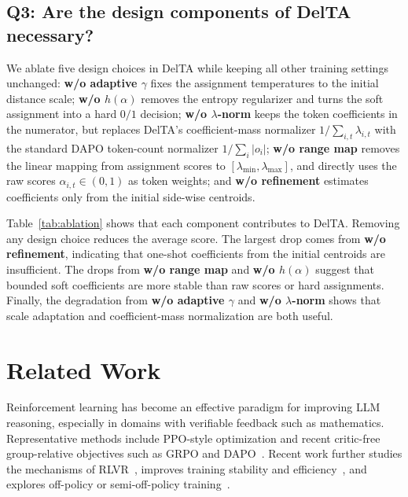 \documentclass{article} %
\begin{document}
\subsection{Q3: Are the design components of DelTA necessary?}
\label{sec:ablation}

We ablate five design choices in DelTA while keeping all other training settings unchanged:
\textbf{w/o adaptive \(\gamma\)} fixes the assignment temperatures to the initial distance scale;
\textbf{w/o \(h(\alpha)\)} removes the entropy regularizer and turns the soft assignment into a hard \(0/1\) decision;
\textbf{w/o \(\lambda\)-norm} keeps the token coefficients in the numerator, but replaces DelTA's coefficient-mass normalizer \(1/\sum_{i,t}\lambda_{i,t}\) with the standard DAPO token-count normalizer \(1/\sum_i |o_i|\); \textbf{w/o range map} removes the linear mapping from assignment scores to \([\lambda_{\min},\lambda_{\max}]\), and directly uses the raw scores \(\alpha_{i,t}\in(0,1)\) as token weights; and \textbf{w/o refinement} estimates coefficients only from the initial side-wise centroids.



Table~\ref{tab:ablation} shows that each component contributes to DelTA.
Removing any design choice reduces the average score.
The largest drop comes from \textbf{w/o refinement}, indicating that one-shot coefficients from the initial centroids are insufficient.
The drops from \textbf{w/o range map} and \textbf{w/o \(h(\alpha)\)} suggest that bounded soft coefficients are more stable than raw scores or hard assignments.
Finally, the degradation from \textbf{w/o adaptive \(\gamma\)} and \textbf{w/o \(\lambda\)-norm} shows that scale adaptation and coefficient-mass normalization are both useful.



\section{Related Work}

Reinforcement learning has become an effective paradigm for improving LLM reasoning, especially in domains with verifiable feedback such as mathematics. Representative methods include PPO-style optimization and recent critic-free group-relative objectives such as GRPO and DAPO~\citep{schulman2017proximal,shao2024deepseekmath,yu2025dapo}. Recent work further studies the mechanisms of RLVR~\citep{yue2025does,huan2025does,meng2026sparse}, improves training stability and efficiency~\citep{zheng2025group,gao2025soft,liu2025understanding}, and explores off-policy or semi-off-policy training~\citep{yan2025learning,zhang2025stephint}. 
\end{document}
